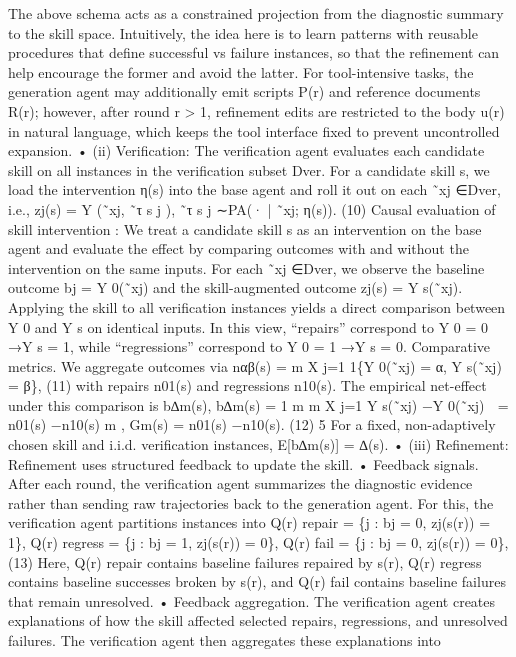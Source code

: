 The above schema acts as a constrained projection from the diagnostic summary to the skill space.
Intuitively, the idea here is to learn patterns with reusable procedures that define successful vs failure
instances, so that the refinement can help encourage the former and avoid the latter.
For tool-intensive tasks, the generation agent may additionally emit scripts P(r) and reference
documents R(r); however, after round r > 1, refinement edits are restricted to the body u(r) in
natural language, which keeps the tool interface fixed to prevent uncontrolled expansion.
• (ii) Verification: The verification agent evaluates each candidate skill on all instances in the
verification subset Dver. For a candidate skill s, we load the intervention η(s) into the base agent and
roll it out on each ˜xj ∈Dver, i.e.,
zj(s) = Y (˜xj, ˜τ s
j ),
˜τ s
j ∼PA(· | ˜xj; η(s)).
(10)
Causal evaluation of skill intervention : We treat a candidate skill s as an intervention on the base
agent and evaluate the effect by comparing outcomes with and without the intervention on the same
inputs. For each ˜xj ∈Dver, we observe the baseline outcome bj = Y 0(˜xj) and the skill-augmented
outcome zj(s) = Y s(˜xj). Applying the skill to all verification instances yields a direct comparison
between Y 0 and Y s on identical inputs. In this view, “repairs” correspond to Y 0 = 0 →Y s = 1,
while “regressions” correspond to Y 0 = 1 →Y s = 0.
Comparative metrics. We aggregate outcomes via
nαβ(s) =
m
X
j=1
1\{Y 0(˜xj) = α, Y s(˜xj) = β\},
(11)
with repairs n01(s) and regressions n10(s). The empirical net-effect under this comparison is b∆m(s),
b∆m(s) = 1
m
m
X
j=1
 Y s(˜xj) −Y 0(˜xj)

= n01(s) −n10(s)
m
,
Gm(s) = n01(s) −n10(s). (12)
5
For a fixed, non-adaptively chosen skill and i.i.d. verification instances, E[b∆m(s)] = ∆(s).
• (iii) Refinement: Refinement uses structured feedback to update the skill. • Feedback signals.
After each round, the verification agent summarizes the diagnostic evidence rather than sending raw
trajectories back to the generation agent. For this, the verification agent partitions instances into
Q(r)
repair = \{j : bj = 0, zj(s(r)) = 1\},
Q(r)
regress = \{j : bj = 1, zj(s(r)) = 0\},
Q(r)
fail = \{j : bj = 0, zj(s(r)) = 0\},
(13)
Here, Q(r)
repair contains baseline failures repaired by s(r), Q(r)
regress contains baseline successes broken
by s(r), and Q(r)
fail contains baseline failures that remain unresolved. • Feedback aggregation. The
verification agent creates explanations of how the skill affected selected repairs, regressions, and
unresolved failures. The verification agent then aggregates these explanations into
